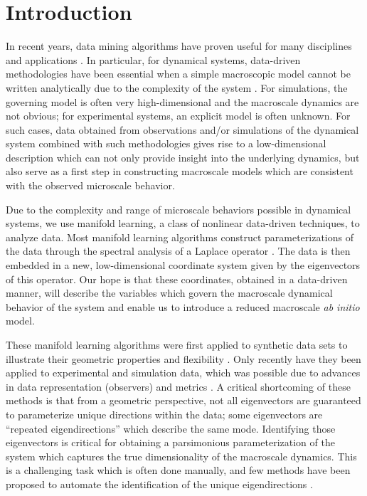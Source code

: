 \documentclass[3p]{elsarticle}
\begin{document}
\section{Introduction}

In recent years, data mining algorithms have proven useful for many disciplines and applications \cite{gepshtein2013image, fernandez2014diffusion, singer2011viewing, yuan2014automated, zhao2003face, trapnell2014dynamics, kemelmacher2011exploring, sifre2013rotation}. 
%
In particular, for dynamical systems, data-driven methodologies have been essential when a simple macroscopic model cannot be written analytically due to the complexity of the system \cite{talmon2014intrinsic,berry2013time,singer2009detecting,ferguson2010systematic}.
%
For simulations, the governing model is often very high-dimensional and the macroscale dynamics are not obvious; for experimental systems, an explicit model is often unknown. 
%
For such cases, data obtained from observations and/or simulations of the dynamical system combined with such methodologies gives rise to a low-dimensional description which can not only provide insight into the underlying dynamics, but also serve as a first step in constructing macroscale models which are consistent with the observed microscale behavior. 

Due to the complexity and range of microscale behaviors possible in dynamical systems, we use manifold learning, a class of nonlinear data-driven techniques, to analyze data.
%
Most manifold learning algorithms construct parameterizations of the data through the spectral analysis of a Laplace operator \cite{Belkin2003,coifman2005geometric,coifman2006geometric,singer2008non}.
%
The data is then embedded in a new, low-dimensional coordinate system given by the eigenvectors of this operator. 
%
Our hope is that these coordinates, obtained in a data-driven manner, will describe the variables which govern the macroscale dynamical behavior of the system and enable us to introduce a reduced macroscale {\em ab initio} model. 

These manifold learning algorithms were first applied to synthetic data sets to illustrate their geometric properties and flexibility \cite{coifman2005geometric, nadler2006diffusion}. 
%
Only recently have they been applied to experimental and simulation data, which was possible due to advances in data representation (observers) and metrics \cite{rubner2000earth,mallat2012group,talmon2013empirical,zhao2014rotationally,rohrdanz2011determination.}.
%
A critical shortcoming of these methods is that from a geometric perspective, not all eigenvectors are guaranteed to parameterize unique directions within the data; some eigenvectors are ``repeated eigendirections'' which describe the same mode. 
%
Identifying those eigenvectors is critical for obtaining a parsimonious parameterization of the system which captures the true dimensionality of the macroscale dynamics.  
%
This is a challenging task which is often done manually, and few methods have been proposed to automate the identification of the unique eigendirections \cite{gerber2007robust}. 
\end{document}
